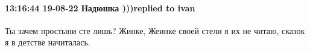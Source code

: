  
 
 
 
 

\paragraph{13:16:44 19-08-22 Надюшка )))replied to ivan}

Ты зачем простыни сте лишь? Жинке, Жеинке своей стели я их не читаю, сказок я в
детстве начиталась.

